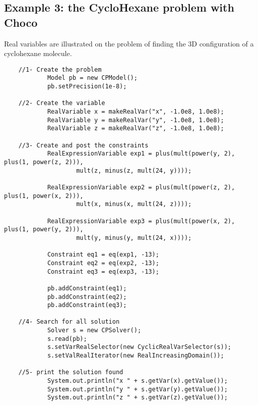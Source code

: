 \subsection{Example 3: the CycloHexane problem with Choco}\label{model:example3:thecyclohexaneproblemwithchoco}\hypertarget{model:example3:thecyclohexaneproblemwithchoco}{}
Real variables are illustrated on the problem of finding the 3D configuration of a cyclohexane molecule. 
\begin{lstlisting}
	//1- Create the problem
	        Model pb = new CPModel();
	        pb.setPrecision(1e-8);
	
	//2- Create the variable
	        RealVariable x = makeRealVar("x", -1.0e8, 1.0e8);
	        RealVariable y = makeRealVar("y", -1.0e8, 1.0e8);
	        RealVariable z = makeRealVar("z", -1.0e8, 1.0e8);
	
	//3- Create and post the constraints
	        RealExpressionVariable exp1 = plus(mult(power(y, 2), plus(1, power(z, 2))),
	                mult(z, minus(z, mult(24, y))));
	
	        RealExpressionVariable exp2 = plus(mult(power(z, 2), plus(1, power(x, 2))),
	                mult(x, minus(x, mult(24, z))));
	
	        RealExpressionVariable exp3 = plus(mult(power(x, 2), plus(1, power(y, 2))),
	                mult(y, minus(y, mult(24, x))));
	
	        Constraint eq1 = eq(exp1, -13);
	        Constraint eq2 = eq(exp2, -13);
	        Constraint eq3 = eq(exp3, -13);
	
	        pb.addConstraint(eq1);
	        pb.addConstraint(eq2);
	        pb.addConstraint(eq3);
	
	//4- Search for all solution
	        Solver s = new CPSolver();
	        s.read(pb);
	        s.setVarRealSelector(new CyclicRealVarSelector(s));
	        s.setValRealIterator(new RealIncreasingDomain());
	
	//5- print the solution found
	        System.out.println("x " + s.getVar(x).getValue());
	        System.out.println("y " + s.getVar(y).getValue());
	        System.out.println("z " + s.getVar(z).getValue());
\end{lstlisting}

